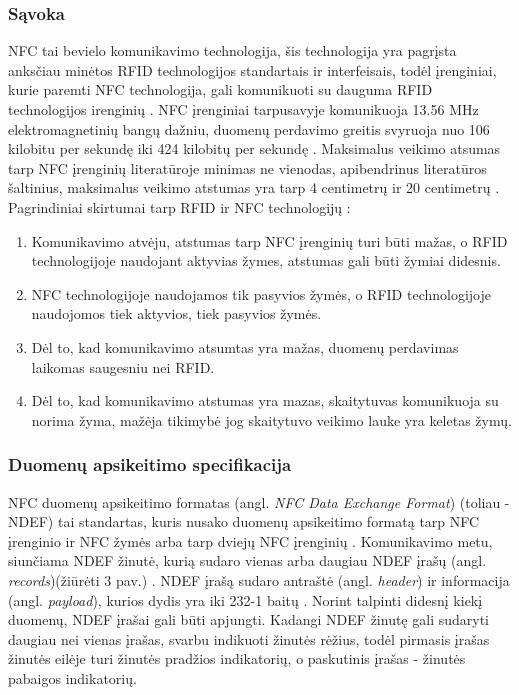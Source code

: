 \subsubsection{Sąvoka}
NFC tai bevielo komunikavimo technologija, šis technologija yra pagrįsta anksčiau minėtos RFID technologijos standartais ir interfeisais, todėl įrenginiai, kurie paremti NFC technologija, gali komunikuoti su dauguma RFID technologijos irenginių \cite{Motlagh2012}. NFC įrenginiai tarpusavyje komunikuoja 13.56 MHz elektromagnetinių bangų dažniu, duomenų perdavimo greitis svyruoja nuo 106 kilobitu per sekundę iki 424 kilobitų per sekundę \cite{whitepapaer}. Maksimalus veikimo atsumas tarp NFC įrenginių literatūroje minimas ne vienodas, apibendrinus literatūros šaltinius, maksimalus veikimo atstumas yra tarp 4 centimetrų ir 20 centimetrų \cite{whitepapaer} \cite{Motlagh2012} \cite{Leora1980}. Pagrindiniai skirtumai tarp RFID ir NFC technologijų \cite{Leora1980}:
\begin{enumerate}
    \item Komunikavimo atvėju, atstumas tarp NFC įrenginių turi būti mažas, o RFID technologijoje naudojant aktyvias žymes, atstumas gali būti žymiai didesnis.
    \item NFC technologijoje naudojamos tik pasyvios žymės, o RFID technologijoje naudojomos tiek aktyvios, tiek pasyvios žymės.
    \item Dėl to, kad komunikavimo atsumtas yra mažas, duomenų perdavimas laikomas saugesniu nei RFID.
    \item Dėl to, kad komunikavimo atstumas yra mazas, skaitytuvas komunikuoja su norima žyma, mažėja tikimybė jog skaitytuvo veikimo lauke yra keletas žymų.
\end{enumerate}
 

\subsubsection{Duomenų apsikeitimo specifikacija}
NFC duomenų apsikeitimo formatas (angl. \textit{NFC Data Exchange Format}) (toliau - NDEF) tai standartas, kuris nusako duomenų apsikeitimo formatą tarp NFC įrenginio ir NFC žymės arba tarp dviejų NFC įrenginių \cite{Leora1980}. Komunikavimo metu, siunčiama NDEF žinutė, kurią sudaro vienas arba daugiau NDEF įrašų (angl. \textit{records})(žiūrėti 3 pav.) . NDEF įrašą sudaro antraštė (angl. \textit{header}) ir informacija (angl. \textit{payload}), kurios dydis yra iki 2\textup{32}-1 baitų \cite{NFCForum2006}. Norint talpinti didesnį kiekį duomenų, NDEF įrašai gali būti apjungti. Kadangi NDEF žinutę gali sudaryti daugiau nei vienas įrašas, svarbu indikuoti žinutės rėžius, todėl pirmasis įrašas žinutės eilėje turi žinutės pradžios indikatorių, o paskutinis įrašas - žinutės pabaigos indikatorių.

